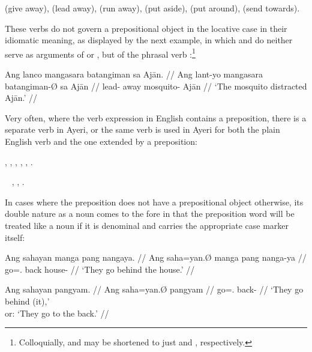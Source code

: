 \pex
\a {} (give away),
\a {} (lead away),
\a {} (run away),
\a {} (put aside),
\a {} (put around),
\a {} (send towards).
\xe

These verbs do not govern a prepositional object in the locative case in their 
idiomatic meaning, as displayed by the next example, in which 
 and  do neither serve as 
arguments of  or , but of the phrasal 
verb :\footnote{Colloquially, 
 and  may be shortened to just 
 and , respectively.}

\ex\begingl
	\gla Ang lanco mangasara batangiman sa Ajān. //
	\glb Ang lant-yo mangasara batangiman-Ø sa Ajān //
	\glc \AgtT{} lead-\TsgN{} away mosquito-\Top{} \Parg{} Ajān //
	\glft `The mosquito distracted Ajān.' //
\endgl\xe

Very often, where the verb expression in English contains a preposition, there 
is a separate verb in Ayeri, or the same verb is used in Ayeri for both the 
plain English verb and the one extended by a preposition:

\pex
	\a {},
	\a {},
	\a {},
	\a {},
	\a {},
	\a {}.
\xe

\pex~
	\a {},
	\a {},
	\a {}.
\xe

In cases where the preposition does not have a prepositional object otherwise, 
its double nature as a noun comes to the fore in that the preposition word will 
be treated like a noun if it is denominal and carries the appropriate case 
marker itself:

\pex
\a\begingl
	\gla Ang sahayan manga pang nangaya. //
	\glb Ang saha=yan.Ø manga pang nanga-ya //
	\glc \AgtT{} go=\Tpl{}.\Top{} \Dyn{} back house-\Loc{} //
	\glft `They go behind the house.' //
\endgl

\a\begingl
	\gla Ang sahayan pangyam. //
	\glb Ang saha=yan.Ø pangyam //
	\glc \AgtT{} go=\Tpl{}.\Top{} back-\Dat{} //
	\glft `They go behind (it),'\\
		or: `They go to the back.' //
\endgl

